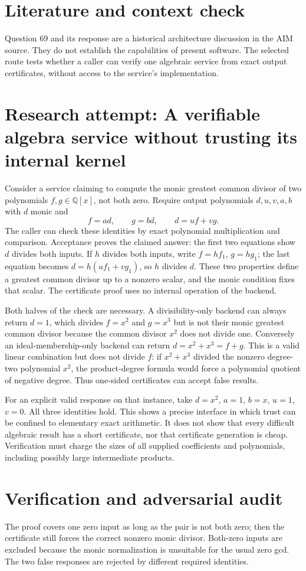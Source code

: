 \documentclass[11pt]{article}
\begin{document}
\section{Literature and context check}
Question 69 and its response are a historical architecture discussion in the AIM source. They do not establish the capabilities of present software. The selected route tests whether a caller can verify one algebraic service from exact output certificates, without access to the service's implementation.
\section{Research attempt: A verifiable algebra service without trusting its internal kernel}
Consider a service claiming to compute the monic greatest common divisor of two polynomials $f,g\in\mathbb Q[x]$, not both zero. Require output polynomials $d,u,v,a,b$ with $d$ monic and
\[
f=ad,\qquad g=bd,\qquad d=uf+vg.
\]
The caller can check these identities by exact polynomial multiplication and comparison. Acceptance proves the claimed answer: the first two equations show $d$ divides both inputs. If $h$ divides both inputs, write $f=hf_1$, $g=hg_1$; the last equation becomes $d=h(uf_1+vg_1)$, so $h$ divides $d$. These two properties define a greatest common divisor up to a nonzero scalar, and the monic condition fixes that scalar. The certificate proof uses no internal operation of the backend.

Both halves of the check are necessary. A divisibility-only backend can always return $d=1$, which divides $f=x^2$ and $g=x^3$ but is not their monic greatest common divisor because the common divisor $x^2$ does not divide one. Conversely an ideal-membership-only backend can return $d=x^2+x^3=f+g$. This is a valid linear combination but does not divide $f$: if $x^2+x^3$ divided the nonzero degree-two polynomial $x^2$, the product-degree formula would force a polynomial quotient of negative degree. Thus one-sided certificates can accept false results.

For an explicit valid response on that instance, take $d=x^2$, $a=1$, $b=x$, $u=1$, $v=0$. All three identities hold. This shows a precise interface in which trust can be confined to elementary exact arithmetic. It does not show that every difficult algebraic result has a short certificate, nor that certificate generation is cheap. Verification must charge the sizes of all supplied coefficients and polynomials, including possibly large intermediate products.
\section{Verification and adversarial audit}
The proof covers one zero input as long as the pair is not both zero; then the certificate still forces the correct nonzero monic divisor. Both-zero inputs are excluded because the monic normalization is unsuitable for the usual zero gcd. The two false responses are rejected by different required identities.
\end{document}
